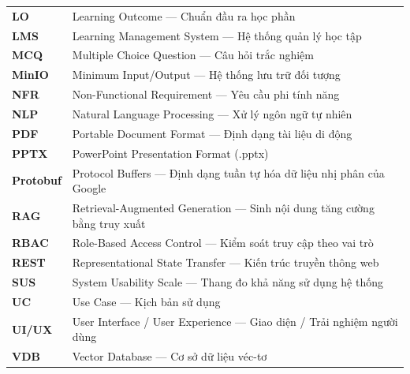 \begin{longtable}{p{3.5cm}p{11cm}}
    \textbf{LO}     & Learning Outcome --- Chuẩn đầu ra học phần \\[3pt]
    \textbf{LMS}    & Learning Management System --- Hệ thống quản lý học tập \\[3pt]
    \textbf{MCQ}    & Multiple Choice Question --- Câu hỏi trắc nghiệm \\[3pt]
    \textbf{MinIO}  & Minimum Input/Output --- Hệ thống lưu trữ đối tượng \\[3pt]
    \textbf{NFR}    & Non-Functional Requirement --- Yêu cầu phi tính năng \\[3pt]
    \textbf{NLP}    & Natural Language Processing --- Xử lý ngôn ngữ tự nhiên \\[3pt]
    \textbf{PDF}    & Portable Document Format --- Định dạng tài liệu di động \\[3pt]
    \textbf{PPTX}   & PowerPoint Presentation Format (.pptx) \\[3pt]
    \textbf{Protobuf}& Protocol Buffers --- Định dạng tuần tự hóa dữ liệu nhị phân của Google \\[3pt]
    \textbf{RAG}    & Retrieval-Augmented Generation --- Sinh nội dung tăng cường bằng truy xuất \\[3pt]
    \textbf{RBAC}   & Role-Based Access Control --- Kiểm soát truy cập theo vai trò \\[3pt]
    \textbf{REST}   & Representational State Transfer --- Kiến trúc truyền thông web \\[3pt]
    \textbf{SUS}    & System Usability Scale --- Thang đo khả năng sử dụng hệ thống \\[3pt]
    \textbf{UC}     & Use Case --- Kịch bản sử dụng \\[3pt]
    \textbf{UI/UX}  & User Interface / User Experience --- Giao diện / Trải nghiệm người dùng \\[3pt]
    \textbf{VDB}    & Vector Database --- Cơ sở dữ liệu véc-tơ \\[3pt]

    \bottomrule
\end{longtable}
